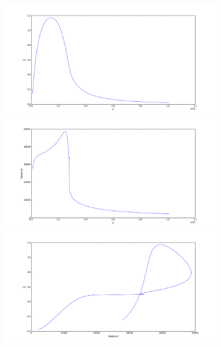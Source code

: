 \documentclass[11pt,a4paper]{article}
\begin{document}
\begin{figure}[!ht]
\begin{center}
\includegraphics[width=0.85\textwidth]{figure_0.png}
\includegraphics[width=0.85\textwidth]{figure_1.png}
\includegraphics[width=0.85\textwidth]{figure_2.png}
\end{center}
\end{figure}
\end{document}
